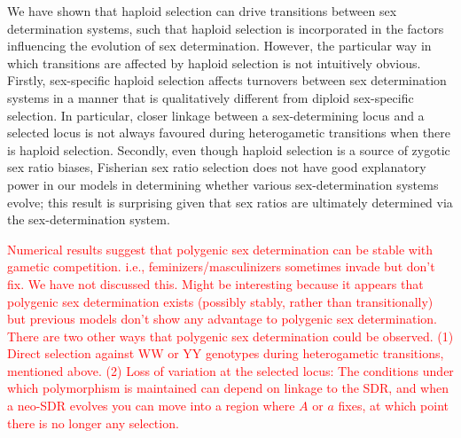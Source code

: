 \documentclass[12pt]{article}
\begin{document}
We have shown that haploid selection can drive transitions between sex determination systems, such that haploid selection is incorporated in the factors influencing the evolution of sex determination. 
However, the particular way in which transitions are affected by haploid selection is not intuitively obvious. 
Firstly, sex-specific haploid selection affects turnovers between sex determination systems in a manner that is qualitatively different from diploid sex-specific selection. 
In particular, closer linkage between a sex-determining locus and a selected locus is not always favoured during heterogametic transitions when there is haploid selection. 
Secondly, even though haploid selection is a source of zygotic sex ratio biases, Fisherian sex ratio selection does not have good explanatory power in our models in determining whether various sex-determination systems evolve; this result is surprising given that sex ratios are ultimately determined via the sex-determination system.

\textcolor{red}{Numerical results suggest that polygenic sex determination can be stable with gametic competition. i.e., feminizers/masculinizers sometimes invade but don't fix. We have not discussed this. Might be interesting because it appears that polygenic sex determination exists (possibly stably, rather than transitionally) but previous models don't show any advantage to polygenic sex determination. There are two other ways that polygenic sex determination could be observed. (1) Direct selection against WW or YY genotypes during heterogametic transitions, mentioned above. (2) Loss of variation at the selected locus: The conditions under which polymorphism is maintained can depend on linkage to the SDR, and when a neo-SDR evolves you can move into a region where $A$ or $a$ fixes, at which point there is no longer any selection.}

\end{document}
